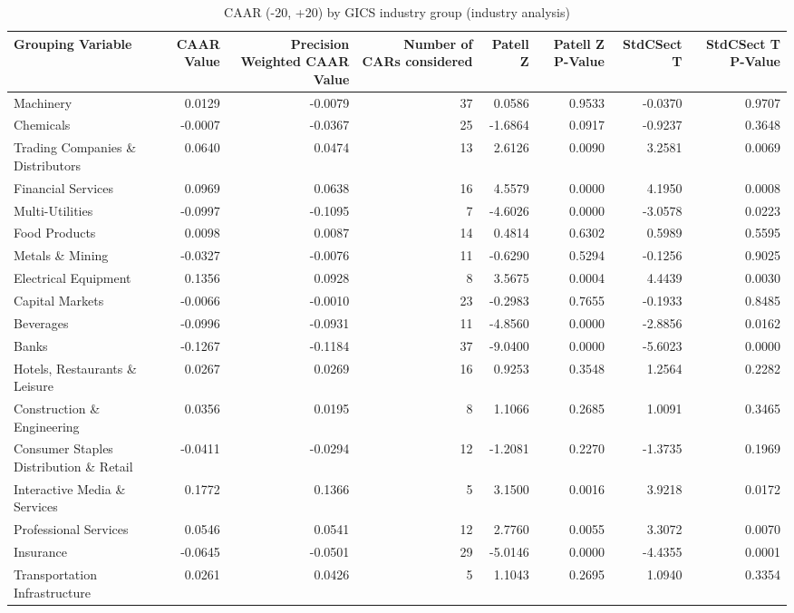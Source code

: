 \begin{table}
\caption{CAAR (-20, +20) by GICS industry group (industry analysis)}
\label{tab:industry_caar}
\begin{tabular}{lrrrrrrr}
\toprule
Grouping Variable & CAAR Value & Precision Weighted CAAR Value & Number of CARs considered & Patell Z & Patell Z P-Value & StdCSect T & StdCSect T P-Value \\
\midrule
Machinery & 0.0129 & -0.0079 & 37 & 0.0586 & 0.9533 & -0.0370 & 0.9707 \\
Chemicals & -0.0007 & -0.0367 & 25 & -1.6864 & 0.0917 & -0.9237 & 0.3648 \\
Trading Companies \& Distributors & 0.0640 & 0.0474 & 13 & 2.6126 & 0.0090 & 3.2581 & 0.0069 \\
Financial Services & 0.0969 & 0.0638 & 16 & 4.5579 & 0.0000 & 4.1950 & 0.0008 \\
Multi-Utilities & -0.0997 & -0.1095 & 7 & -4.6026 & 0.0000 & -3.0578 & 0.0223 \\
Food Products & 0.0098 & 0.0087 & 14 & 0.4814 & 0.6302 & 0.5989 & 0.5595 \\
Metals \& Mining & -0.0327 & -0.0076 & 11 & -0.6290 & 0.5294 & -0.1256 & 0.9025 \\
Electrical Equipment & 0.1356 & 0.0928 & 8 & 3.5675 & 0.0004 & 4.4439 & 0.0030 \\
Capital Markets & -0.0066 & -0.0010 & 23 & -0.2983 & 0.7655 & -0.1933 & 0.8485 \\
Beverages & -0.0996 & -0.0931 & 11 & -4.8560 & 0.0000 & -2.8856 & 0.0162 \\
Banks & -0.1267 & -0.1184 & 37 & -9.0400 & 0.0000 & -5.6023 & 0.0000 \\
Hotels, Restaurants \& Leisure & 0.0267 & 0.0269 & 16 & 0.9253 & 0.3548 & 1.2564 & 0.2282 \\
Construction \& Engineering & 0.0356 & 0.0195 & 8 & 1.1066 & 0.2685 & 1.0091 & 0.3465 \\
Consumer Staples Distribution \& Retail & -0.0411 & -0.0294 & 12 & -1.2081 & 0.2270 & -1.3735 & 0.1969 \\
Interactive Media \& Services & 0.1772 & 0.1366 & 5 & 3.1500 & 0.0016 & 3.9218 & 0.0172 \\
Professional Services & 0.0546 & 0.0541 & 12 & 2.7760 & 0.0055 & 3.3072 & 0.0070 \\
Insurance & -0.0645 & -0.0501 & 29 & -5.0146 & 0.0000 & -4.4355 & 0.0001 \\
Transportation Infrastructure & 0.0261 & 0.0426 & 5 & 1.1043 & 0.2695 & 1.0940 & 0.3354 \\

\end{tabular}
\end{table}
